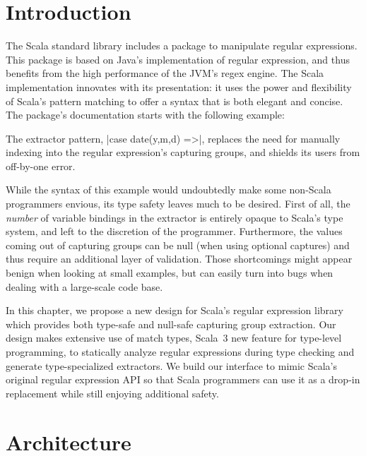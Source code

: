 \section{Introduction}

The Scala standard library includes a package to manipulate regular expressions.
This package is based on Java's implementation of regular expression, and thus benefits from the high performance of the JVM's regex engine.
The Scala implementation innovates with its presentation: it uses the power and flexibility of Scala's pattern matching to offer a syntax that is both elegant and concise.
The package's documentation starts with the following example:

\regexDocumentation

\noindent
The extractor pattern, |case date(y,m,d) =>|, replaces the need for manually indexing into the regular expression's capturing groups, and shields its users from off-by-one error.

While the syntax of this example would undoubtedly make some non-Scala programmers envious, its type safety leaves much to be desired.
First of all, the \emph{number} of variable bindings in the extractor is entirely opaque to Scala's type system, and left to the discretion of the programmer.
Furthermore, the values coming out of capturing groups can be null (when using optional captures) and thus require an additional layer of validation.
Those shortcomings might appear benign when looking at small examples, but can easily turn into bugs when dealing with a large-scale code base.

In this chapter, we propose a new design for Scala's regular expression library which provides both type-safe and null-safe capturing group extraction.
Our design makes extensive use of match types, Scala~3 new feature for type-level programming, to statically analyze regular expressions during type checking and generate type-specialized extractors.
We build our interface to mimic Scala's original regular expression API so that Scala programmers can use it as a drop-in replacement while still enjoying additional safety.

\section{Architecture}

